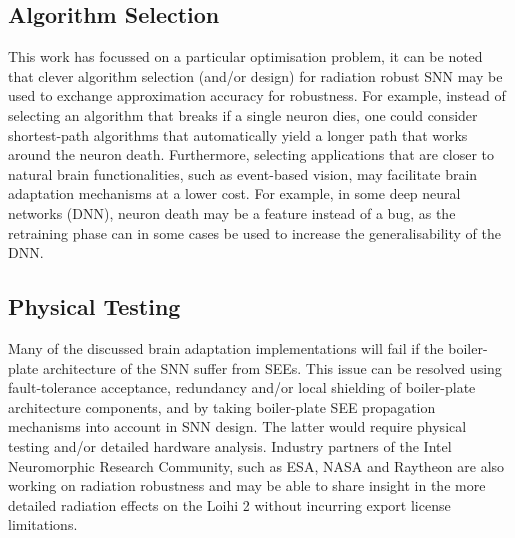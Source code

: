\subsection{Algorithm Selection}\label{subsec:algorithm_selection}
This work has focussed on a particular optimisation problem, it can be noted that clever algorithm selection (and/or design) for radiation robust SNN may be used to exchange approximation accuracy for robustness. For example, instead of selecting an algorithm that breaks if a single neuron dies, one could consider shortest-path algorithms that automatically yield a longer path that works around the neuron death. Furthermore, selecting applications that are closer to natural brain functionalities, such as event-based vision, may facilitate brain adaptation mechanisms at a lower cost. For example, in some deep neural networks (DNN), neuron death may be a feature instead of a bug, as the retraining phase can in some cases be used to increase the generalisability of the DNN. %

\subsection{Physical Testing}\label{subsec:physical_testing}
Many of the discussed brain adaptation implementations will fail if the boiler-plate architecture of the SNN suffer from SEEs. This issue can be resolved using fault-tolerance acceptance, redundancy and/or local shielding of boiler-plate architecture components, and by taking boiler-plate SEE propagation mechanisms into account in SNN design. The latter would require physical testing and/or detailed hardware analysis. Industry partners of the Intel Neuromorphic Research Community, such as ESA, NASA and Raytheon are also working on radiation robustness \cite{inrc_meeting} and may be able to share insight in the more detailed radiation effects on the Loihi 2 without incurring export license limitations.
